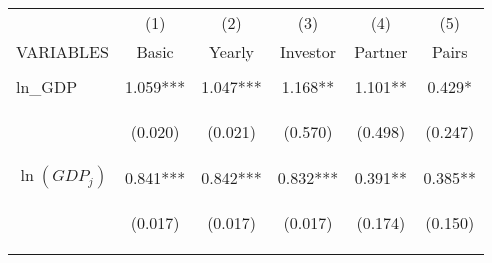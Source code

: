 \begin{center}
\begin{tabular}{lccccc} \hline
 & (1) & (2) & (3) & (4) & (5) \\
VARIABLES & Basic & Yearly & Investor & Partner & Pairs \\ \hline
\vspace{4pt} & \begin{footnotesize}\end{footnotesize} & \begin{footnotesize}\end{footnotesize} & \begin{footnotesize}\end{footnotesize} & \begin{footnotesize}\end{footnotesize} & \begin{footnotesize}\end{footnotesize} \\
ln\_GDP & 1.059*** & 1.047*** & 1.168** & 1.101** & 0.429* \\
\vspace{4pt} & \begin{footnotesize}(0.020)\end{footnotesize} & \begin{footnotesize}(0.021)\end{footnotesize} & \begin{footnotesize}(0.570)\end{footnotesize} & \begin{footnotesize}(0.498)\end{footnotesize} & \begin{footnotesize}(0.247)\end{footnotesize} \\
$\ln(GDP_j)$ & 0.841*** & 0.842*** & 0.832*** & 0.391** & 0.385** \\
\vspace{4pt} & \begin{footnotesize}(0.017)\end{footnotesize} & \begin{footnotesize}(0.017)\end{footnotesize} & \begin{footnotesize}(0.017)\end{footnotesize} & \begin{footnotesize}(0.174)\end{footnotesize} & \begin{footnotesize}(0.150)\end{footnotesize} \\

\end{tabular}
\end{center}
